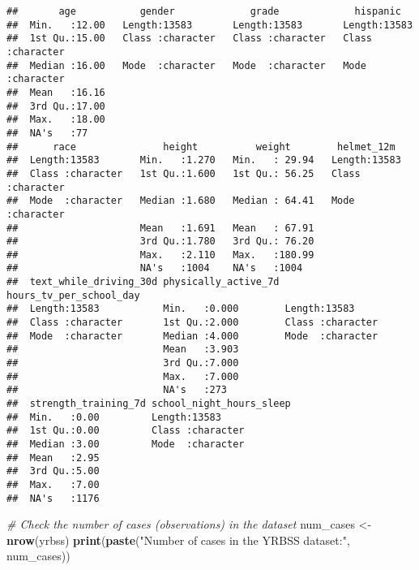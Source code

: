 \documentclass[
]{article}
\newenvironment{Shaded}{\begin{snugshade}}{\end{snugshade}}
\newcommand{\CommentTok}[1]{\textcolor[rgb]{0.56,0.35,0.01}{\textit{#1}}}
\newcommand{\FunctionTok}[1]{\textcolor[rgb]{0.13,0.29,0.53}{\textbf{#1}}}
\newcommand{\NormalTok}[1]{#1}
\newcommand{\OtherTok}[1]{\textcolor[rgb]{0.56,0.35,0.01}{#1}}
\newcommand{\StringTok}[1]{\textcolor[rgb]{0.31,0.60,0.02}{#1}}
\begin{document}
\begin{verbatim}
##       age           gender             grade             hispanic        
##  Min.   :12.00   Length:13583       Length:13583       Length:13583      
##  1st Qu.:15.00   Class :character   Class :character   Class :character  
##  Median :16.00   Mode  :character   Mode  :character   Mode  :character  
##  Mean   :16.16                                                           
##  3rd Qu.:17.00                                                           
##  Max.   :18.00                                                           
##  NA's   :77                                                              
##      race               height          weight        helmet_12m       
##  Length:13583       Min.   :1.270   Min.   : 29.94   Length:13583      
##  Class :character   1st Qu.:1.600   1st Qu.: 56.25   Class :character  
##  Mode  :character   Median :1.680   Median : 64.41   Mode  :character  
##                     Mean   :1.691   Mean   : 67.91                     
##                     3rd Qu.:1.780   3rd Qu.: 76.20                     
##                     Max.   :2.110   Max.   :180.99                     
##                     NA's   :1004    NA's   :1004                       
##  text_while_driving_30d physically_active_7d hours_tv_per_school_day
##  Length:13583           Min.   :0.000        Length:13583           
##  Class :character       1st Qu.:2.000        Class :character       
##  Mode  :character       Median :4.000        Mode  :character       
##                         Mean   :3.903                               
##                         3rd Qu.:7.000                               
##                         Max.   :7.000                               
##                         NA's   :273                                 
##  strength_training_7d school_night_hours_sleep
##  Min.   :0.00         Length:13583            
##  1st Qu.:0.00         Class :character        
##  Median :3.00         Mode  :character        
##  Mean   :2.95                                 
##  3rd Qu.:5.00                                 
##  Max.   :7.00                                 
##  NA's   :1176
\end{verbatim}

\begin{Shaded}
\begin{Highlighting}[]
\CommentTok{\# Check the number of cases (observations) in the dataset}
\NormalTok{num\_cases }\OtherTok{\textless{}{-}} \FunctionTok{nrow}\NormalTok{(yrbss)}
\FunctionTok{print}\NormalTok{(}\FunctionTok{paste}\NormalTok{(}\StringTok{"Number of cases in the YRBSS dataset:"}\NormalTok{, num\_cases))}
\end{Highlighting}
\end{Shaded}
\end{document}
